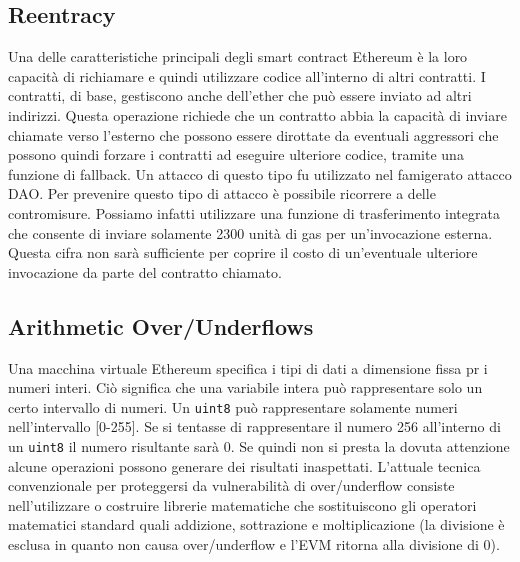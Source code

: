\subsection*{Reentracy}
Una delle caratteristiche principali degli smart contract Ethereum è la loro capacità di richiamare e quindi utilizzare codice all'interno di altri contratti. I contratti, di base, gestiscono anche dell'ether che può essere inviato ad altri indirizzi. Questa operazione richiede che un contratto abbia la capacità di inviare chiamate verso l'esterno che possono essere dirottate da eventuali aggressori che possono quindi forzare i contratti ad eseguire ulteriore codice, tramite una funzione di fallback. Un attacco di questo tipo fu utilizzato nel famigerato attacco DAO. Per prevenire questo tipo di attacco è possibile ricorrere a delle contromisure. Possiamo infatti utilizzare una funzione di trasferimento integrata che consente di inviare solamente 2300 unità di gas per un'invocazione esterna. Questa cifra non sarà sufficiente per coprire il costo di un'eventuale ulteriore invocazione da parte del contratto chiamato.

\subsection*{Arithmetic Over/Underflows}
Una macchina virtuale Ethereum specifica i tipi di dati a dimensione fissa pr i numeri interi. Ciò significa che una variabile intera può rappresentare solo un certo intervallo di numeri. Un \lstinline|uint8| può rappresentare solamente numeri nell'intervallo [0-255]. Se si tentasse di rappresentare il numero 256 all'interno di un \lstinline|uint8| il numero risultante sarà 0. Se quindi non si presta la dovuta attenzione alcune operazioni possono generare dei risultati inaspettati. L'attuale tecnica convenzionale per proteggersi da vulnerabilità di over/underflow consiste nell'utilizzare o costruire librerie matematiche che sostituiscono gli operatori matematici standard quali addizione, sottrazione e moltiplicazione (la divisione è esclusa in quanto non causa over/underflow e l'EVM ritorna alla divisione di 0).

